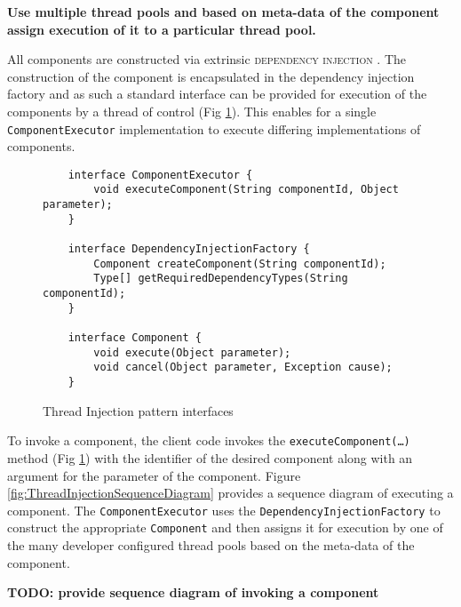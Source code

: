 \documentclass[prodmode]{style/acmlarge}
\begin{document}
\textbf{Use multiple thread pools and based on meta-data of the component assign execution of it to a particular thread pool.}

All components are constructed via extrinsic \textsc{dependency injection}
\cite{ioc}.  The construction of the component is encapsulated in the dependency
injection factory and as such a standard interface can be provided for execution
of the components by a thread of control (Fig
\ref{fig:ThreadInjectionInterfaces}).  This enables for a single
\texttt{ComponentExecutor} implementation to execute differing implementations
of components.

\begin{figure}[tp]
\centering
\begin{verbatim}
    interface ComponentExecutor {
        void executeComponent(String componentId, Object parameter);
    }

    interface DependencyInjectionFactory {
        Component createComponent(String componentId);
        Type[] getRequiredDependencyTypes(String componentId);
    }

    interface Component {
        void execute(Object parameter); 
        void cancel(Object parameter, Exception cause);
    }
\end{verbatim}
\caption{Thread Injection pattern interfaces\footnotemark}
\label{fig:ThreadInjectionInterfaces}
\end{figure}

To invoke a component, the client code invokes the
\texttt{executeComponent(\ldots)} method (Fig
\ref{fig:ThreadInjectionInterfaces}) with the identifier of the desired
component along with an argument for the parameter of the component.
Figure \ref{fig:ThreadInjectionSequenceDiagram} provides a sequence diagram of
executing a component.  The \texttt{ComponentExecutor} uses the
\texttt{DependencyInjectionFactory} to construct the appropriate
\texttt{Component} and then assigns it for execution by one of the many
developer configured thread pools based on the meta-data of the component.

\textbf{TODO: provide sequence diagram of invoking a component}
\end{document}
